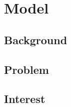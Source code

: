 {\justifying
	\chapter{Model}
	\section{Background}
	\section{Problem}
	\section{Interest}
}\cleanalldata
